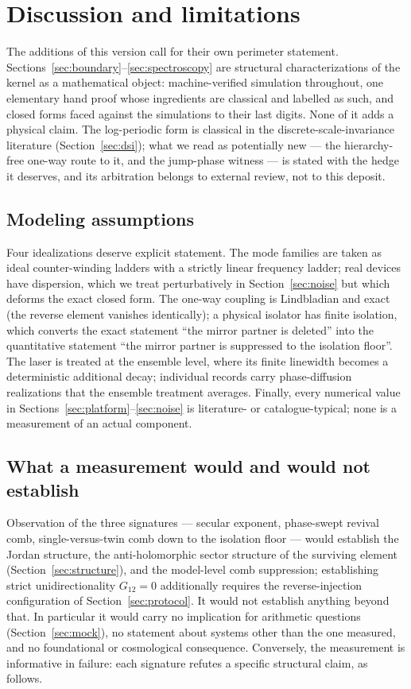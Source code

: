 \documentclass[11pt,a4paper]{article}
\begin{document}
\section{Discussion and limitations}
\label{sec:discussion}

The additions of this version call for their own perimeter statement.
Sections~\ref{sec:boundary}--\ref{sec:spectroscopy} are structural
characterizations of the kernel as a mathematical object: machine-verified
simulation throughout, one elementary hand proof whose ingredients are
classical and labelled as such, and closed forms faced against the
simulations to their last digits. None of it adds a physical claim. The
log-periodic form is classical in the discrete-scale-invariance literature
(Section~\ref{sec:dsi}); what we read as potentially new --- the
hierarchy-free one-way route to it, and the jump-phase witness --- is
stated with the hedge it deserves, and its arbitration belongs to external
review, not to this deposit.

\subsection{Modeling assumptions}

Four idealizations deserve explicit statement. The mode families are taken as
ideal counter-winding ladders with a strictly linear frequency ladder; real
devices have dispersion, which we treat perturbatively in
Section~\ref{sec:noise} but which deforms the exact closed form. The one-way
coupling is Lindbladian and exact (the reverse element vanishes identically); a
physical isolator has finite isolation, which converts the exact statement
``the mirror partner is deleted'' into the quantitative statement ``the mirror
partner is suppressed to the isolation floor''. The laser is treated at the
ensemble level, where its finite linewidth becomes a deterministic additional
decay; individual records carry phase-diffusion realizations that the ensemble
treatment averages. Finally, every numerical value in
Sections~\ref{sec:platform}--\ref{sec:noise} is literature- or
catalogue-typical; none is a measurement of an actual component.

\subsection{What a measurement would and would not establish}

Observation of the three signatures --- secular exponent, phase-swept revival
comb, single-versus-twin comb down to the isolation floor --- would establish
the Jordan structure, the anti-holomorphic sector structure of the surviving
element (Section~\ref{sec:structure}), and the model-level comb suppression;
establishing strict unidirectionality $G_{12} = 0$ additionally requires the
reverse-injection configuration of Section~\ref{sec:protocol}. It would not
establish anything beyond that. In
particular it would carry no implication for arithmetic questions
(Section~\ref{sec:mock}), no statement about systems other than the one
measured, and no foundational or cosmological consequence. Conversely, the
measurement is informative in failure: each signature refutes a specific
structural claim, as follows.
\end{document}
